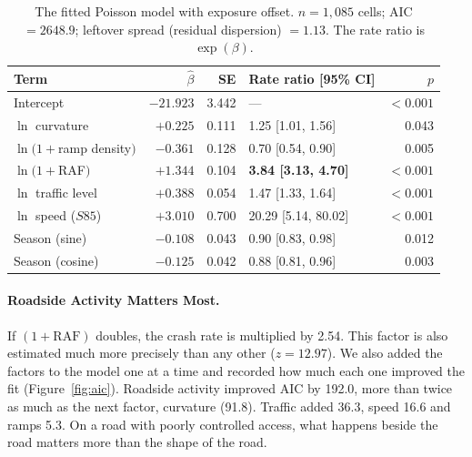 \documentclass[11pt]{article}
\begin{document}
\begin{table}[htbp]
\centering
\caption{The fitted Poisson model with exposure offset. $n=1{,}085$ cells;
AIC $=2648.9$; leftover spread (residual dispersion) $=1.13$. The rate ratio is
$\exp(\beta)$.}
\label{tab:coef}
\small
\begin{tabular}{@{}lrrlr@{}}
\toprule
\textbf{Term} & $\hat{\beta}$ & \textbf{SE} & \textbf{Rate ratio [95\% CI]} & $p$ \\
\midrule
Intercept                 & $-21.923$ & 3.442 & ---                        & $<0.001$ \\
$\ln$ curvature           & $+0.225$  & 0.111 & 1.25 [1.01, 1.56]          & 0.043 \\
$\ln(1+$ramp density$)$   & $-0.361$  & 0.128 & 0.70 [0.54, 0.90]          & 0.005 \\
$\ln(1+$RAF$)$            & $+1.344$  & 0.104 & \textbf{3.84 [3.13, 4.70]} & $<0.001$ \\
$\ln$ traffic level       & $+0.388$  & 0.054 & 1.47 [1.33, 1.64]          & $<0.001$ \\
$\ln$ speed ($S85$)       & $+3.010$  & 0.700 & 20.29 [5.14, 80.02]        & $<0.001$ \\
Season (sine)             & $-0.108$  & 0.043 & 0.90 [0.83, 0.98]          & 0.012 \\
Season (cosine)           & $-0.125$  & 0.042 & 0.88 [0.81, 0.96]          & 0.003 \\
\bottomrule
\end{tabular}
\end{table}

\paragraph{Roadside Activity Matters Most.}
If $(1+\mathrm{RAF})$ doubles, the crash rate is multiplied by 2.54. This
factor is also estimated much more precisely than any other ($z=12.97$). We
also added the factors to the model one at a time and recorded how much each
one improved the fit (Figure~\ref{fig:aic}). Roadside activity improved AIC by
192.0, more than twice as much as the next factor, curvature (91.8). Traffic
added 36.3, speed 16.6 and ramps 5.3. On a road with poorly controlled access,
what happens beside the road matters more than the shape of the road.
\end{document}
